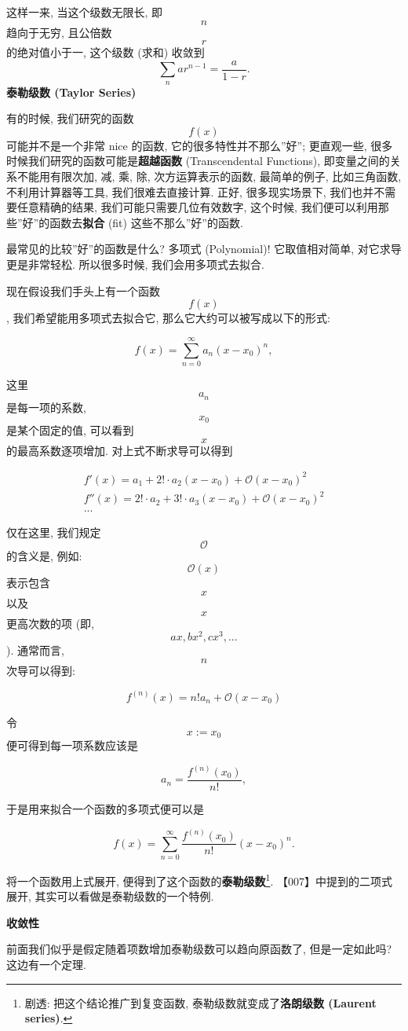 这样一来, 当这个级数无限长, 即 \[n\] 趋向于无穷, 且公倍数 \[r\]
的绝对值小于一, 这个级数 (求和) 收敛到 \[
\sum_nar^{n-1}=\frac{a}{1-r}.
\] \textbf{泰勒级数 (Taylor Series)}

有的时候, 我们研究的函数 \[f(x)\] 可能并不是一个非常 nice 的函数,
它的很多特性并不那么''好''; 更直观一些,
很多时候我们研究的函数可能是\textbf{超越函数} (Transcendental
Functions), 即变量之间的关系不能用有限次加, 减, 乘, 除,
次方运算表示的函数, 最简单的例子, 比如三角函数, 不利用计算器等工具,
我们很难去直接计算. 正好, 很多现实场景下, 我们也并不需要任意精确的结果,
我们可能只需要几位有效数字, 这个时候,
我们便可以利用那些''好''的函数去\textbf{拟合} (fit)
这些不那么''好''的函数.

最常见的比较''好''的函数是什么? 多项式 (Polynomial)! 它取值相对简单,
对它求导更是非常轻松. 所以很多时候, 我们会用多项式去拟合.

现在假设我们手头上有一个函数 \[f(x)\], 我们希望能用多项式去拟合它,
那么它大约可以被写成以下的形式:

\[
f(x)=\sum_{n=0}^\infty a_n(x-x_0)^n,
\]

这里 \[a_n\] 是每一项的系数, \[x_0\] 是某个固定的值, 可以看到 \[x\]
的最高系数逐项增加. 对上式不断求导可以得到

\[
\begin{gather*}
f'(x)=a_1+2!\cdot a_2(x-x_0)+\mathcal{O}(x-x_0)^2\\
f''(x)=2!\cdot a_2+3!\cdot a_3(x-x_0)+\mathcal{O}(x-x_0)^2\\
...
\end{gather*}
\]

仅在这里, 我们规定 \[\mathcal{O}\] 的含义是, 例如: \[\mathcal{O}(x)\]
表示包含 \[x\] 以及 \[x\] 更高次数的项 (即, \[ax, bx^2, cx^3, ...\] ).
通常而言, \[n\] 次导可以得到:

\[
f^{(n)}(x)=n!a_n+\mathcal{O}(x-x_0)
\]

令 \[x:=x_0\] 便可得到每一项系数应该是

\[
a_n=\frac{f^{(n)}(x_0)}{n!},
\]

于是用来拟合一个函数的多项式便可以是

\[
\boxed{f(x)=\sum_{n=0}^\infty\frac{f^{(n)}(x_0)}{n!}(x-x_0)^n.}
\]

将一个函数用上式展开, 便得到了这个函数的\textbf{泰勒级数}\footnote{剧透:
  把这个结论推广到复变函数, 泰勒级数就变成了\textbf{洛朗级数 (Laurent
  series)}.}. 【007】中提到的二项式展开,
其实可以看做是泰勒级数的一个特例.

\textbf{收敛性}

前面我们似乎是假定随着项数增加泰勒级数可以趋向原函数了, 但是一定如此吗?
这边有一个定理.

